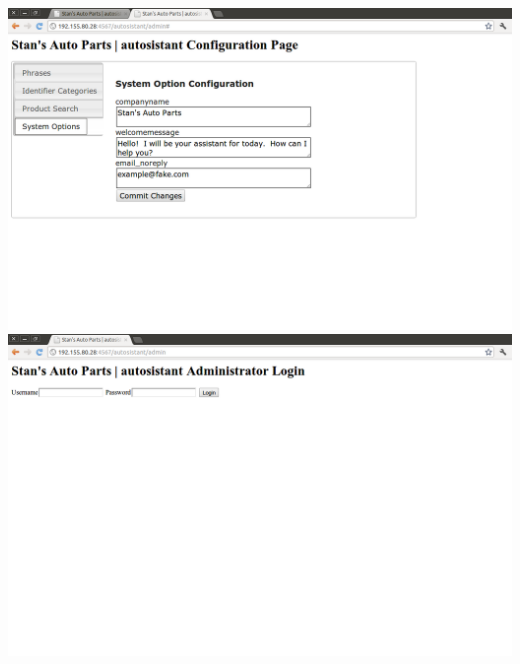 \documentclass[11pt, titlepage]{article}
\begin{document}
\includegraphics[scale=0.35]{autosistantgui05.png}
\includegraphics[scale=0.35]{autosistantgui06.png}
\end{document}
